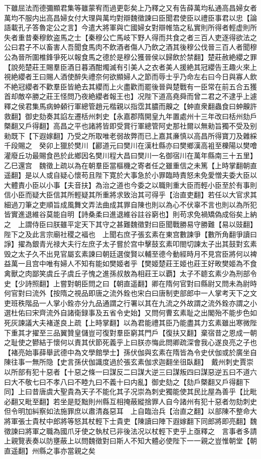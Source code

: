 下雖屈法而德彌顯君集等雖蒙宥而過更彰矣上乃釋之又有告薛萬均私通高昌婦女者萬均不服内出高昌婦女付大理與萬均對辯魏徵諫曰臣聞君使臣以禮臣事君以忠【論語載孔子答魯定公之言】今遣大將軍與亡國婦女對辯帷箔之私實則所得者輕虚則所失者重昔秦穆飲盗馬之士【秦穆公亡馬岐下野人得而共食之者三百人吏逐得欲法之公曰君子不以畜害人吾聞食馬肉不飲酒者傷人乃飲之酒其後穆公伐晉三百人者聞穆公為晉所圍椎鋒爭死以報食馬之德於是穆公獲晉侯以歸飲於禁翻】楚莊赦絶纓之罪【說苑楚莊王賜羣臣酒日暮酒酣燭滅有引美人之衣者美人援絶其冠纓告王趣火來上視絶纓者王曰賜人酒使醉失禮奈何欲顯婦人之節而辱士乎乃命左右曰今日與寡人飲不絶冠纓者不歡羣臣皆絶去其纓而上火盡歡而罷後晉與楚戰有一臣常在前五合五獲首却敵卒勝之莊王怪問乃夜絶纓者報王也】况陛下道高堯舜而曾二君之不逮乎上遽釋之侯君集馬病蚛顙行軍總管趙元楷親以指霑其膿而齅之【蚛直衆翻蟲食曰蚛齅許救翻】御史劾奏其諂左遷栝州刺史【永嘉郡隋開皇九年置處州十三年改曰栝州劾戶槩翻又戶得翻】高昌之平也諸將皆即受賞行軍總管阿史那社爾以無勑旨獨不受及别勑既下【下遐嫁翻】乃受之所取唯老弱故弊而已上嘉其亷慎以高昌所得寶刀及雜綵千段賜之　癸卯上獵於樊川【酈道元曰樊川在漢杜縣亦曰樊鄉漢高袓至櫟陽以樊噲灌廢丘功最賜食邑於此鄉因名樊川程大昌曰樊川一名御宿川在萬年縣南三十五里】乙巳還宫　魏徵上疏以為在朝羣臣當樞機之寄者任之雖重信之未篤【上時掌翻朝直遥翻】是以人或自疑心懷苟且陛下寛於大事急於小罪臨時責怒未免愛憎夫委大臣以大體責小臣以小事【夫音扶】為治之道也今委之以職則重大臣而輕小臣至於有事則信小臣而疑大臣信其所輕疑其所重將求致治其可得乎【治直吏翻】若任以大官求其細過刀筆之吏順旨成風舞文弄法曲成其罪自陳也則以為心不伏辜不言也則以為所犯皆實進退維谷莫能自明【詩桑柔曰進退維谷註谷窮也】則苟求免禍矯偽成俗矣上納之　上謂侍臣曰朕雖平定天下其守之甚難魏徵對曰臣聞戰勝易守勝難【易以豉翻】陛下之及此言宗廟社稷之褔也　上聞右庶子張玄素在東宫數諫爭【數所角翻爭讀曰諍】擢為銀青光禄大夫行左庶子太子嘗於宫中擊鼓玄素叩閤切諫太子出其鼓對玄素毁之太子久不出見官屬玄素諫曰朝廷選俊賢以輔至德今動經時月不見宫臣將何以裨益萬一且宫中唯有婦人不知有能如樊姬者乎【樊姬楚莊王姬也莊王好畋樊姬為不食禽獸之肉鄙笑虞丘子虞丘子愧之進孫叔敖為相莊王以覇】太子不聼玄素少為刑部令史【少詩照翻】上嘗對朝臣問之曰【朝直遥翻】卿在隋何官對曰縣尉又問未為尉時何官對曰流外【按隋之視品即唐之流外銓也宋白曰唐制吏部郎中一人掌考天下之文吏班秩階品一人掌小銓亦分九品通謂之行署以其在九流之外故謂之流外銓亦謂之小選杜佑曰宋齊流外自諸衛録事及五省令史始】又問何曹玄素耻之出閣殆不能步色如死灰諫議大夫褚遂良上疏【上時掌翻】以為君能禮其臣乃能盡其力玄素雖出寒微陛下重其才擢至三品翼贊皇儲豈可復對羣臣窮其門戶【復扶又翻】棄宿昔之恩成一朝之耻使之鬰結于懷何以責其伏節死義乎上曰朕亦悔此問卿疏深會我心遂良亮之子也【褚亮始事薛舉武德中為文學館學士】孫伏伽與玄素在隋皆為令史伏伽或於廣坐自陳往事一無所隐【史言孫伏伽識度過於張玄素伽求迦翻坐徂臥翻】　戴州刺史賈崇以所部有犯十惡者【十惡之條一曰謀反二曰謀大逆三曰謀叛四曰謀惡逆五曰不道六曰大不敬七曰不孝八曰不睦九曰不義十曰内亂】御史劾之【劾戶槩翻又戶得翻下同】上曰昔唐虞大聖貴為天子不能化其子况崇為刺史獨能使其民比屋為善乎【比毗必翻又毗至翻】若坐是貶黜則州縣互相掩蔽縱捨罪人自今諸州有犯十惡者勿劾刺史但令明加糾察如法施罪庶以肅清姦惡耳　上自臨治兵【治直之翻】以部陳不整命大將軍張士貴杖中郎將等怒其杖輕下士貴吏【陳讀曰陣下遐嫁翻下同郎將即亮翻】魏徵諫曰將軍之職為國爪牙使之執杖已非後法况以杖輕下吏乎上亟釋之　言事者多請上親覽表奏以防壅蔽上以問魏徵對曰斯人不知大體必使陛下一一親之豈惟朝堂【朝直遥翻】州縣之事亦當親之矣

